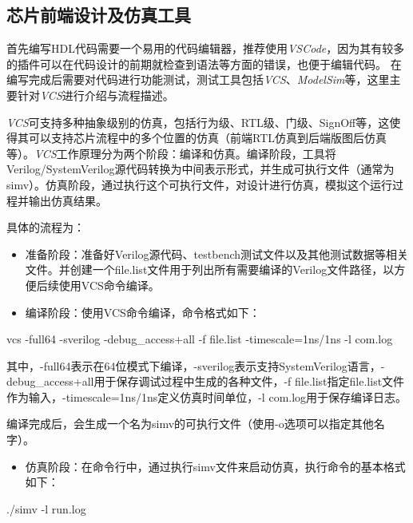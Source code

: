\subsection{芯片前端设计及仿真工具}\label{sec:15-chip-preparation-008}

首先编写HDL代码需要一个易用的代码编辑器，推荐使用\emph{VSCode}，因为其有较多的插件可以在代码设计的前期就检查到语法等方面的错误，也便于编辑代码。
在编写完成后需要对代码进行功能测试，测试工具包括\emph{VCS}、\emph{ModelSim}等，这里主要针对\emph{VCS}进行介绍与流程描述。

\emph{VCS}可支持多种抽象级别的仿真，包括行为级、RTL级、门级、SignOff等，这使得其可以支持芯片流程中的多个位置的仿真（前端RTL仿真到后端版图后仿真等）。\emph{VCS}工作原理分为两个阶段：编译和仿真。编译阶段，工具将Verilog/SystemVerilog源代码转换为中间表示形式，并生成可执行文件（通常为simv）。仿真阶段，通过执行这个可执行文件，对设计进行仿真，模拟这个运行过程并输出仿真结果。

具体的流程为：

\begin{itemize}
\item
  准备阶段：准备好Verilog源代码、testbench测试文件以及其他测试数据等相关文件。并创建一个file.list文件用于列出所有需要编译的Verilog文件路径，以方便后续使用VCS命令编译。
\item
  编译阶段：使用VCS命令编译，命令格式如下：
\end{itemize}

\begin{CodeBlock}[language=BookShell]
vcs -full64 -sverilog -debug_access+all -f file.list -timescale=1ns/1ns -l com.log
\end{CodeBlock}

其中，-full64表示在64位模式下编译，-sverilog表示支持SystemVerilog语言，-debug\_access+all用于保存调试过程中生成的各种文件，-f
file.list指定file.list文件作为输入，-timescale=1ns/1ns定义仿真时间单位，-l
com.log用于保存编译日志。

编译完成后，会生成一个名为simv的可执行文件（使用-o选项可以指定其他名字）。

\begin{itemize}
\tightlist
\item
  仿真阶段：在命令行中，通过执行simv文件来启动仿真，执行命令的基本格式如下：
\end{itemize}

\begin{CodeBlock}[language=BookShell]
./simv -l run.log
\end{CodeBlock}

